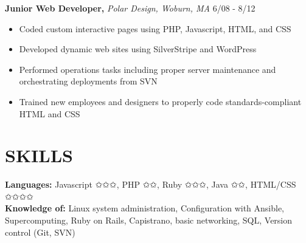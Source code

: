 \documentclass[line, margin]{res}
\begin{document}
\begin{resume}
\begin{itemize}
\end{itemize}
\textbf{Junior Web Developer,} \textit{Polar Design, Woburn, MA} \hfill 6/08 - 8/12
\begin{itemize}
    \item Coded custom interactive pages using PHP, Javascript, HTML, and CSS
    \item Developed dynamic web sites using SilverStripe and WordPress
    \item Performed operations tasks including proper server maintenance and orchestrating deployments from SVN
    \item Trained new employees and designers to properly code standards-compliant HTML and CSS
\end{itemize}

\section{SKILLS}
\textbf{Languages: }Javascript {\dingbats ✩✩✩}, PHP {\dingbats ✩✩}, Ruby {\dingbats ✩✩✩}, Java {\dingbats ✩✩}, HTML/CSS {\dingbats ✩✩✩✩} \\
\textbf{Knowledge of: }Linux system administration, Configuration with Ansible, Supercomputing, Ruby on Rails, Capistrano, basic networking, SQL, Version control (Git, SVN)
\end{resume}
\end{document}
